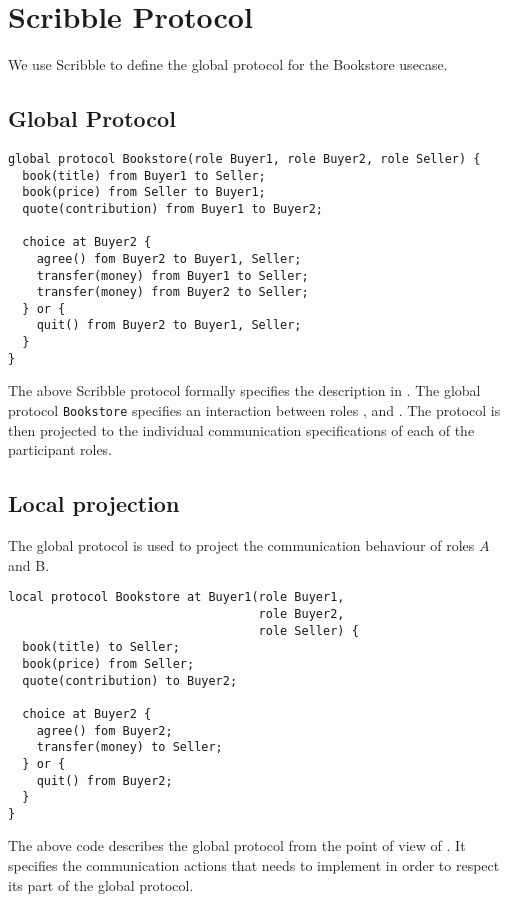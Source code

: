 \section{Scribble Protocol}

We use Scribble to define the global
protocol for the Bookstore usecase.

\subsection{Global Protocol}


\begin{lstlisting}[caption={Global Protocol for Bookstore}]
global protocol Bookstore(role Buyer1, role Buyer2, role Seller) {
  book(title) from Buyer1 to Seller;
  book(price) from Seller to Buyer1;
  quote(contribution) from Buyer1 to Buyer2;

  choice at Buyer2 {
    agree() fom Buyer2 to Buyer1, Seller;
    transfer(money) from Buyer1 to Seller;
    transfer(money) from Buyer2 to Seller;
  } or {
    quit() from Buyer2 to Buyer1, Seller;
  }
}
\end{lstlisting}

The above Scribble protocol formally specifies
the description in .
The global protocol \lstinline|Bookstore| specifies
an interaction between roles \BuyerOne, \BuyerTwo and
\Seller. The protocol is then projected to the
individual communication specifications of each 
of the participant roles.



\subsection{Local projection}
The global protocol is used to project the communication
behaviour of roles $A$ and B.


\begin{lstlisting}[caption={Local Protocol for Role \BuyerOne}]
local protocol Bookstore at Buyer1(role Buyer1,
                                   role Buyer2,
                                   role Seller) {
  book(title) to Seller;
  book(price) from Seller;
  quote(contribution) to Buyer2;

  choice at Buyer2 {
    agree() fom Buyer2;
    transfer(money) to Seller;
  } or {
    quit() from Buyer2;
  }
}
\end{lstlisting}

The above code describes the global protocol from the
point of view of \BuyerOne. It specifies the
communication actions that \BuyerOne needs to implement
in order to respect its part of the global protocol. 


